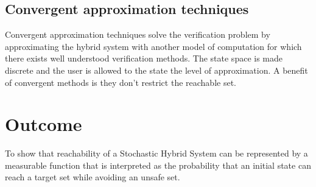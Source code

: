 \documentclass{article}
\begin{document}
\subsection{Convergent approximation techniques}
Convergent approximation techniques solve the verification problem by approximating the hybrid system with another model of computation for which there exists well understood verification methods. The state space is made discrete and the user is allowed to the state the level of approximation. A benefit of convergent methods is they don’t restrict the reachable set.

\section{Outcome}
To show that reachability of a Stochastic Hybrid System can be represented by a measurable function that is interpreted as the probability that an initial state can reach a target set while avoiding an unsafe set.



\end{document}
